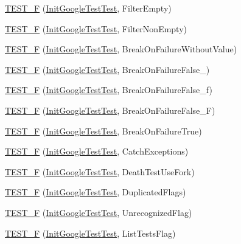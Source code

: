 \begin{DoxyCompactItemize}
\hyperlink{namespacetesting_a04d011d2e5695513c45216ae1b98095b}{T\+E\+S\+T\+\_\+F} (\hyperlink{classtesting_1_1_init_google_test_test}{Init\+Google\+Test\+Test}, Filter\+Empty)
\item 
\hyperlink{namespacetesting_a69dcb047e8cf4f93e8132faf11ba7110}{T\+E\+S\+T\+\_\+F} (\hyperlink{classtesting_1_1_init_google_test_test}{Init\+Google\+Test\+Test}, Filter\+Non\+Empty)
\item 
\hyperlink{namespacetesting_afc3e46c96f27aa2b502b15e8e4bab2ca}{T\+E\+S\+T\+\_\+F} (\hyperlink{classtesting_1_1_init_google_test_test}{Init\+Google\+Test\+Test}, Break\+On\+Failure\+Without\+Value)
\item 
\hyperlink{namespacetesting_abd2b3ac615374fbe560ba35be4c4e928}{T\+E\+S\+T\+\_\+F} (\hyperlink{classtesting_1_1_init_google_test_test}{Init\+Google\+Test\+Test}, Break\+On\+Failure\+False\+\_)
\item 
\hyperlink{namespacetesting_abb038e044a4f2142414624e482b48eeb}{T\+E\+S\+T\+\_\+F} (\hyperlink{classtesting_1_1_init_google_test_test}{Init\+Google\+Test\+Test}, Break\+On\+Failure\+False\+\_\+f)
\item 
\hyperlink{namespacetesting_aec19373865e49dbd1fe7f22c8db4a256}{T\+E\+S\+T\+\_\+F} (\hyperlink{classtesting_1_1_init_google_test_test}{Init\+Google\+Test\+Test}, Break\+On\+Failure\+False\+\_\+F)
\item 
\hyperlink{namespacetesting_aaf881d7ee8cfa238e9a66d0562937fde}{T\+E\+S\+T\+\_\+F} (\hyperlink{classtesting_1_1_init_google_test_test}{Init\+Google\+Test\+Test}, Break\+On\+Failure\+True)
\item 
\hyperlink{namespacetesting_af59442310531cd96d8aa3ce5acb2d025}{T\+E\+S\+T\+\_\+F} (\hyperlink{classtesting_1_1_init_google_test_test}{Init\+Google\+Test\+Test}, Catch\+Exceptions)
\item 
\hyperlink{namespacetesting_aa5259681257cd3654f34dc81212c82bc}{T\+E\+S\+T\+\_\+F} (\hyperlink{classtesting_1_1_init_google_test_test}{Init\+Google\+Test\+Test}, Death\+Test\+Use\+Fork)
\item 
\hyperlink{namespacetesting_a34b640eb46cf4189bed01f18d42d3277}{T\+E\+S\+T\+\_\+F} (\hyperlink{classtesting_1_1_init_google_test_test}{Init\+Google\+Test\+Test}, Duplicated\+Flags)
\item 
\hyperlink{namespacetesting_a1572c861f65ca8d5dfb61246a32a2799}{T\+E\+S\+T\+\_\+F} (\hyperlink{classtesting_1_1_init_google_test_test}{Init\+Google\+Test\+Test}, Unrecognized\+Flag)
\item 
\hyperlink{namespacetesting_a1d111e67e0c6411085ff6d0911f50d18}{T\+E\+S\+T\+\_\+F} (\hyperlink{classtesting_1_1_init_google_test_test}{Init\+Google\+Test\+Test}, List\+Tests\+Flag)

\end{DoxyCompactItemize}
